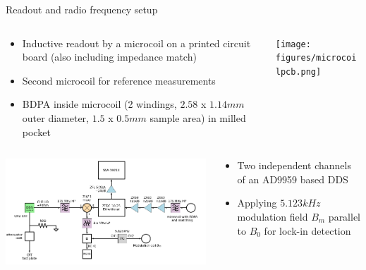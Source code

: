 \documentclass[final]{beamer}
\begin{document}
\begin{frame}[fragile]{}
\begin{columns}[T]
\begin{column}{.49\linewidth}
      \begin{block}{\Large Readout and radio frequency setup}
        \begin{columns}
          \begin{column}{0.6\columnwidth}
            \begin{itemize}
              \item Inductive readout by a microcoil on a printed circuit
                board (also including impedance match)
              \item Second microcoil for reference measurements
              \item BDPA inside microcoil (2 windings, $2.58$ x $1.14mm$
                    outer diameter, $1.5$ x $0.5mm$ sample area) in milled pocket
            \end{itemize}
          \end{column}
          \begin{column}{0.4\columnwidth}

            \texttt{[image: figures/microcoilpcb.png]}
          \end{column}
        \end{columns}

        \begin{columns}
          \begin{column}{0.6\columnwidth}
            \includegraphics[width=\columnwidth]{figures/rfsetup.png}
          \end{column}
          \begin{column}{0.4\columnwidth}
            \begin{itemize}
              \item Two independent channels of an AD9959 based DDS
              \item Applying $5.123 kHz$ modulation field $B_m$ parallel to $B_0$
                for lock-in detection
            \end{itemize}
          \end{column}
        \end{columns}
      \end{block}
  

\end{column}
\end{columns}
\end{frame}
\end{document}
